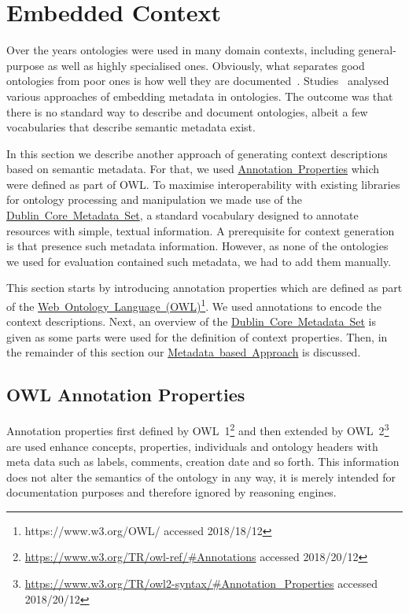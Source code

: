 \section{Embedded Context}\label{sec:embedded_context}
Over the years ontologies were used in many domain contexts, including general-purpose as well as highly specialised ones. Obviously, what separates good ontologies from poor ones is how well they are documented~\cite{daquin2012}. Studies~\cite{dutta2017} analysed various approaches of embedding metadata in ontologies. The outcome was that there is no standard way to describe and document ontologies, albeit a few vocabularies that describe semantic metadata exist. 

In this section we describe another approach of generating context descriptions based on semantic metadata. For that, we used \hyperref[sec:OWL_annotation_properties]{Annotation~Properties} which were defined as part of OWL. To maximise interoperability with existing libraries for ontology processing and manipulation we made use of the \hyperref[sec:dublin_core_metadata_vocabulary]{Dublin~Core~Metadata~Set}, a standard vocabulary designed to annotate resources with simple, textual information. A prerequisite for context generation is that presence such metadata information. However, as none of the ontologies we used for evaluation contained such metadata, we had to add them manually. 

This section starts by introducing annotation properties which are defined as part of the \hyperref[sec:OWL_annotation_properties]{Web~Ontology~Language~(OWL)\footnote{\url{https://www.w3.org/OWL/} accessed 2018/18/12}}. We used annotations to encode the context descriptions. Next, an overview of the \hyperref[sec:dublin_core_metadata_vocabulary]{Dublin~Core~Metadata~Set} is given as some parts were used for the definition of context properties. Then, in the remainder of this section our \hyperref[sec:enrichment_metaData_approach]{Metadata~based~Approach} is discussed.

\subsection{OWL Annotation Properties}\label{sec:OWL_annotation_properties}
Annotation properties first defined by OWL~1\footnote{\url{https://www.w3.org/TR/owl-ref/\#Annotations} accessed 2018/20/12} and then extended by OWL~2\footnote{\url{https://www.w3.org/TR/owl2-syntax/\#Annotation_Properties} accessed 2018/20/12} are used enhance concepts, properties, individuals and ontology headers with meta data such as labels, comments, creation date and so forth. This information does not alter the semantics of the ontology in any way, it is merely intended for documentation purposes and therefore ignored by reasoning engines. 

